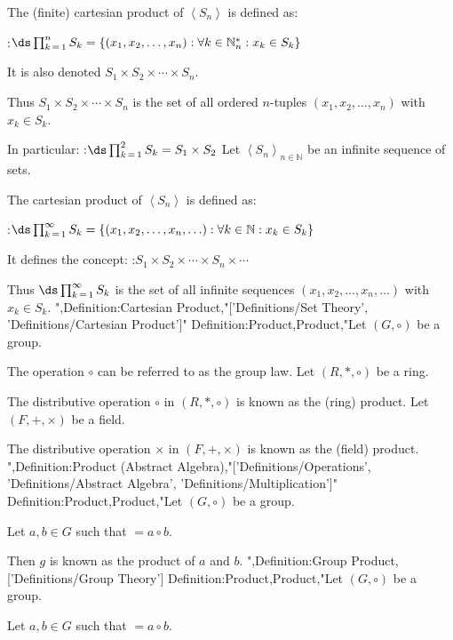 The (finite) cartesian product of $\left\langle S_n \right\rangle$ is defined as:

:$\ds \prod_{k \mathop = 1}^n S_k = \left\lbrace \left( x_1, x_2, \ldots, x_n \right): \forall k \in \mathbb N^*_n: x_k \in S_k \right\rbrace$


It is also denoted $S_1 \times S_2 \times \cdots \times S_n$.

Thus $S_1 \times S_2 \times \cdots \times S_n$ is the set of all ordered $n$-tuples $\left( x_1, x_2, \ldots, x_n \right)$ with $x_k \in S_k$.


In particular:
:$\ds \prod_{k \mathop = 1}^2 S_k = S_1 \times S_2$
Let $\left\langle S_n \right\rangle_{n \mathop \in \mathbb N}$ be an infinite sequence of sets. 

The cartesian product of $\left\langle S_n \right\rangle$ is defined as:

:$\ds \prod_{k \mathop = 1}^\infty S_k = \left\lbrace \left( x_1, x_2, \ldots, x_n, \ldots \right): \forall k \in \mathbb N: x_k \in S_k \right\rbrace$


It defines the concept:
:$S_1 \times S_2 \times \cdots \times S_n \times \cdots$

Thus $\ds \prod_{k \mathop = 1}^\infty S_k$ is the set of all infinite sequences $\left( x_1, x_2, \ldots, x_n, \ldots \right)$ with $x_k \in S_k$.
",Definition:Cartesian Product,"['Definitions/Set Theory', 'Definitions/Cartesian Product']"
Definition:Product,Product,"Let $\left( G, \circ \right)$ be a group.


The operation $\circ$ can be referred to as the group law.
Let $\left( R, *, \circ \right)$ be a ring.


The distributive operation $\circ$ in $\left( R, *, \circ \right)$ is known as the (ring) product.
Let $\left( F, +, \times \right)$ be a field.


The distributive operation $\times$ in $\left( F, +, \times \right)$ is known as the (field) product.
",Definition:Product (Abstract Algebra),"['Definitions/Operations', 'Definitions/Abstract Algebra', 'Definitions/Multiplication']"
Definition:Product,Product,"Let $\left( G, \circ \right)$ be a group.


Let $a, b \in G$ such that $ = a \circ b$.

Then $g$ is known as the product of $a$ and $b$.
",Definition:Group Product,['Definitions/Group Theory']
Definition:Product,Product,"Let $\left( G, \circ \right)$ be a group.


Let $a, b \in G$ such that $ = a \circ b$.

